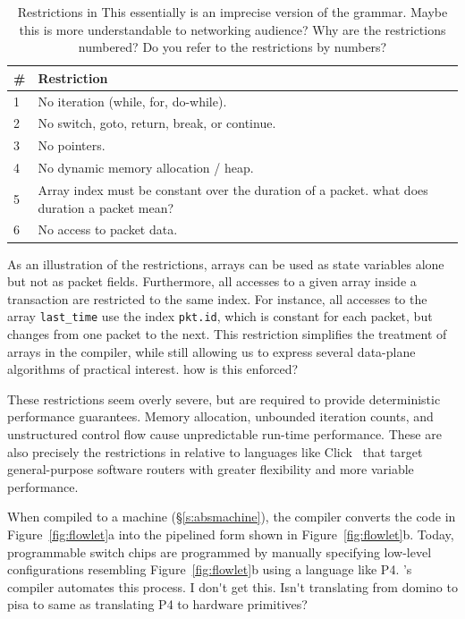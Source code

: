 \begin{table}
  \begin{tabular}{|p{}|p{}|}
    \hline
    \# & Restriction \\
    \hline
    1 & No iteration (while, for, do-while).\\
    \hline
    2 & No switch, goto, return, break, or continue.\\
    \hline
    3 & No pointers.\\
    \hline
    4 & No dynamic memory allocation / heap.\\
    \hline
    5 & Array index must be constant over the duration of a packet. \ac{what does
    duration a packet mean?}\\
    \hline
    6 & No access to packet data.\\
    \hline
  \end{tabular}
  \caption{Restrictions in \pktlanguage \ac{This essentially is an imprecise version of the 
  grammar. Maybe this is more understandable to networking audience? 
  Why are the restrictions numbered? Do you refer to the restrictions by numbers?}}
  \label{tab:restrict}
\end{table}

As an illustration of the restrictions, 
arrays can be used as state variables alone but not as packet fields.
Furthermore, all accesses to a given array inside a transaction are restricted
to the same index.
For instance, all accesses to
the array \texttt{last\_time} use the index \texttt{pkt.id}, which is constant
for each packet, but changes from one packet to the next. This restriction
simplifies the treatment of arrays in the compiler, while still allowing us to
express several data-plane algorithms of practical interest. \ac{how is this enforced?}

These restrictions seem overly severe, but are required to provide
deterministic performance guarantees. Memory allocation, unbounded iteration
counts, and unstructured control flow cause unpredictable run-time
performance. These are also precisely the restrictions in \pktlanguage relative
to languages like Click~\cite{click} that target general-purpose software
routers with greater flexibility and more variable performance.

When compiled to a \absmachine machine (\S\ref{s:absmachine}), the \pktlanguage
compiler converts the code in Figure~\ref{fig:flowlet}a into the pipelined form
shown in Figure~\ref{fig:flowlet}b. Today, programmable switch chips are
programmed by manually specifying low-level configurations resembling
Figure~\ref{fig:flowlet}b using a language like P4. \pktlanguage's compiler
automates this process. \ac{I don't get this. Isn't translating from domino to 
pisa to same as translating P4 to hardware primitives?}
